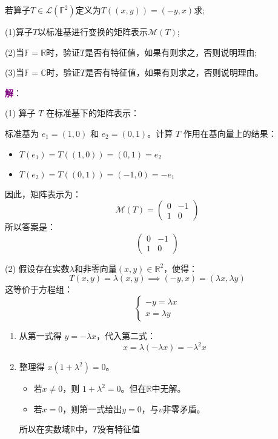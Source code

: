 \begin{example}
	若算子$T\in \mathcal{L}(\mathbb{F}^2)$定义为$T((x,y))=(-y,x)$求;

	(1)算子$T$以标准基进行变换的矩阵表示$\mathcal{M}(T)$;

	(2)当$\mathbb{F}=\mathbb{R}$时，验证$T$是否有特征值，如果有则求之，否则说明理由;

	(3)当$\mathbb{F}=\mathbb{C}$时，验证$T$是否有特征值，如果有则求之，否则说明理由。

	\tcblower
	\textcolor{purple}{\textbf{解}}： 
	
	(1) 算子 $ T $ 在标准基下的矩阵表示：

	标准基为 $ e_1 = (1, 0) $ 和 $ e_2 = (0, 1) $。计算 $ T $ 作用在基向量上的结果：
	\begin{itemize}
		\item $ T(e_1) = T((1, 0)) = (0, 1) = e_2 $
		\item $ T(e_2) = T((0, 1)) = (-1, 0) = -e_1 $
	\end{itemize}
	
	因此，矩阵表示为：
	$$
	\mathcal{M}(T) = \begin{pmatrix} 0 & -1 \\ 1 & 0 \end{pmatrix}
	$$
	所以答案是：
	$$
	\begin{pmatrix} 0 & -1 \\ 1 & 0 \end{pmatrix}
	$$

	(2) 假设存在实数$\lambda$和非零向量$(x,y)\in\mathbb{R}^2$，使得：
	$$
	T(x,y) = \lambda(x,y) \implies (-y, x) = (\lambda x, \lambda y)
	$$
	这等价于方程组：
	$$
	\begin{cases}
	-y = \lambda x \\
	x = \lambda y
	\end{cases}
	$$
	\begin{enumerate}
		\item 从第一式得 $y = -\lambda x$，代入第二式：
		$$
		x = \lambda (-\lambda x) = -\lambda^2 x
		$$
		\item 整理得 $x(1 + \lambda^2) = 0$。
		\begin{itemize}
			\item 若$x \neq 0$，则 $1 + \lambda^2 = 0$。但在$\mathbb{R}$中无解。 
			\item  若$x = 0$，则第一式给出$y = 0$，与$v$非零矛盾。 
		\end{itemize}
		所以在实数域$\mathbb{R}$中，$T$没有特征值


\end{enumerate}
\end{example}
